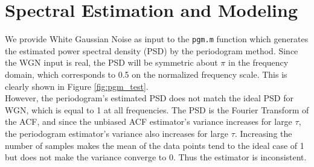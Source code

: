 \documentclass{article}
\begin{document}
\section{Spectral Estimation and Modeling}
\vspace{0.5cm}

We provide White Gaussian Noise as input to the \texttt{pgm.m} function which generates the estimated power spectral density (PSD) by the periodogram method. Since the WGN input is real, the  PSD will be symmetric about $\pi$ in the frequency domain, which corresponds to 0.5 on the normalized frequency scale. This is clearly shown in Figure \ref{fig:pgm_test}.\\

However, the periodogram's estimated PSD does not match the ideal PSD for WGN, which is equal to 1 at all frequencies. The PSD is the Fourier Transform of the ACF, and since the unbiased ACF estimator's variance increases for large $\tau$, the periodogram estimator's variance also increases for large $\tau$. Increasing the number of samples makes the mean of the data points tend to the ideal case of 1 but does not make the variance converge to 0. Thus the estimator is inconsistent.
\end{document}
